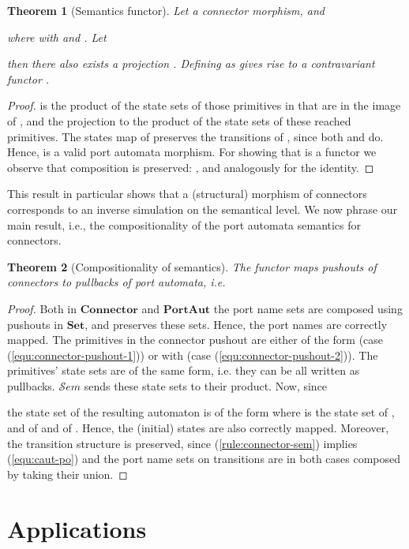 \documentclass[copyright,creativecommons]{eptcs}
\newtheorem{theorem}{Theorem}
\newcommand{\Set}{\ensuremath{\mathbf{Set}}}
\newcommand{\PA}{\ensuremath{\mathbf{PortAut}}}
\newcommand{\Connector}{\ensuremath{\mathbf{Connector}}}
\newcommand{\Sem}{\ensuremath{\mathcal{S}em}}
\begin{document}
\begin{theorem}[Semantics functor]
\label{def:functor}
Let  
a connector morphism, 
 and 
 
where 
with 
and .
Let

then there also exists a projection .
Defining 
as 
gives rise to a contravariant functor 
.
\end{theorem}
\begin{proof}
 is the product of the state sets of those primitives
in  that are in the image of , and
 the projection to the product of the state sets 
of these reached primitives.
The states map of  preserves the transitions
of , since both  and  do.
Hence,  is a valid port automata morphism.
For showing that  is a functor we
observe that composition is preserved: , and analogously for the identity.
\end{proof}
This result in particular shows that a (structural) morphism
of connectors corresponds to an inverse simulation on the
semantical level. 
We now phrase our main result, i.e., the compositionality
of the port automata semantics for connectors.
\begin{theorem}[Compositionality of semantics]
\label{thm:compositionality}
The functor  maps pushouts of connectors to pullbacks of port automata,
i.e.

\end{theorem}
\begin{proof}
Both in {\Connector} and {\PA} the port name sets
are composed using pushouts in \Set, and  
preserves these sets.  Hence, the port names are 
correctly mapped.
The primitives in the connector pushout
 are either of the form
 (case (\ref{equ:connector-pushout-1}))
or  with 
(case (\ref{equ:connector-pushout-2})). The primitives' state
sets are of the same form, i.e. they can be all 
written as pullbacks. {\Sem} sends these 
state sets to their product. Now, since 

the state set of the resulting automaton 
is of the form  where  is the state
set of , and  of  and
 of .  Hence, the (initial) states 
are also correctly mapped.
Moreover, the transition structure is preserved, 
since (\ref{rule:connector-sem}) implies (\ref{equ:caut-po})
and the port name sets on transitions are in both cases
composed by taking their union.
\end{proof}

 
\section{Applications}
\label{sec:encodings}
\end{document}
